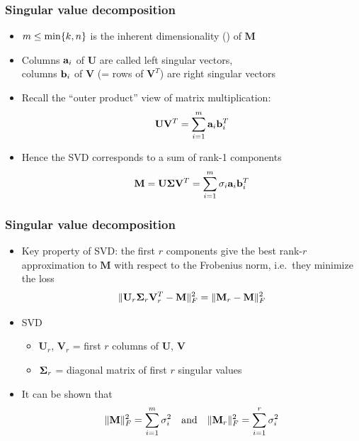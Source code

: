\documentclass[t]{beamer} %
\begin{document}
\begin{frame}
  \frametitle{Singular value decomposition}

  \begin{itemize}
  \item $m \leq \min \set{k, n}$ is the inherent dimensionality () of $\mathbf{M}$
  \item Columns $\va_i$ of $\mathbf{U}$ are called left singular vectors,\\
    columns $\vb_i$ of $\mathbf{V}$ (= rows of $\mathbf{V}^T$) are right singular vectors
  \item<2-> Recall the ``outer product'' view of matrix multiplication:
    \[
      \mathbf{U} \mathbf{V}^T = \sum_{i=1}^m \va_i \vb_i^T
    \]
  \item<3-> Hence the SVD corresponds to a sum of rank-1 components
    \[
      \mathbf{M} = \mathbf{U} \Msigma \mathbf{V}^T = \sum_{i=1}^m \sigma_i \va_i \vb_i^T
    \]
  \end{itemize}
\end{frame}

\begin{frame}
  \frametitle{Singular value decomposition}

  \begin{itemize}
  \item Key property of SVD: the first $r$ components give the best rank-$r$
    approximation to $\mathbf{M}$ with respect to the Frobenius norm, i.e.\ they minimize the loss
    \[
      \norm[F]{ \mathbf{U}_r \Msigma_r \mathbf{V}_r^T - \mathbf{M} }^2
      = \norm[F]{ \mathbf{M}_r - \mathbf{M} }^2
    \]
  \item[\hand]  SVD
    \begin{itemize}
    \item $\mathbf{U}_r$, $\mathbf{V}_r$ = first $r$ columns of $\mathbf{U}$, $\mathbf{V}$
    \item $\Msigma_r$ = diagonal matrix of first $r$ singular values
    \end{itemize}
  \item<2-> It can be shown that
    \[
      \norm[F]{ \mathbf{M} }^2 = \sum_{i=1}^m \sigma_i^2 \quad \text{and} \quad
      \norm[F]{ \mathbf{M}_r }^2 = \sum_{i=1}^r \sigma_i^2      
    \]
  \end{itemize}
\end{frame}
\end{document}

